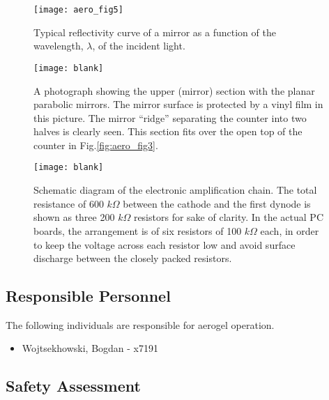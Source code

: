 \begin{figure}[htp]
\texttt{[image: aero\_fig5]}
\caption[Aerogel: reflectivity]{
 Typical reflectivity curve of a mirror as a function of the 
 wavelength, $\lambda$, of the incident light.
 }
\label{fig:aero_fig5}
\end{figure}

\begin{figure}[p]
\texttt{[image: blank]}
\caption[Aerogel: upper mirror]{
 A photograph showing the upper (mirror) section with the planar
 parabolic mirrors.  The mirror surface is protected by a vinyl film in this
 picture.  The mirror ``ridge'' separating the counter into two halves is
 clearly seen.  This section fits over the open top of the counter in Fig.\ref{fig:aero_fig3}.
 }
\label{fig:aero_fig6}
\end{figure}

\begin{figure}[p]
\texttt{[image: blank]}
\caption[Aerogel: amplification chain]{
 Schematic diagram of the electronic amplification chain. The total 
 resistance of 600 $k\Omega$ between the cathode and the first dynode is shown 
 as three 200 $k\Omega$ resistors for sake of clarity. In the actual PC boards, 
 the arrangement is of six resistors of 100 $k\Omega$ each, in order to 
 keep the voltage across each resistor low and avoid surface discharge 
 between the closely packed resistors.
 }
\label{fig:aero_fig7}
\end{figure}

\subsection{Responsible Personnel} 
The following individuals are responsible for aerogel \Cerenkov operation. 
\begin{itemize}
\item[~]Wojtsekhowski, Bogdan - x7191 
\end{itemize} 
 
\subsection{Safety Assessment}

